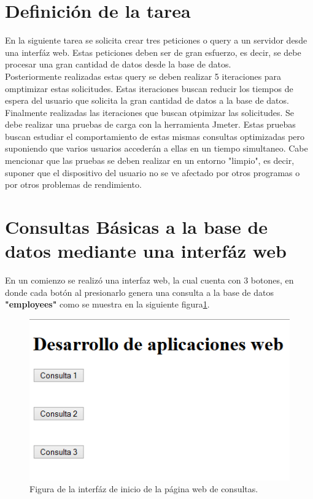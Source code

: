 \section{Definición de la tarea} \label{tarea}

En la siguiente tarea se solicita crear tres peticiones o query a un servidor desde una interfáz web. Estas peticiones deben ser de gran esfuerzo, es decir, se debe procesar una gran cantidad de datos desde la base de datos.\\

Posteriormente realizadas estas query se deben realizar 5 iteraciones para omptimizar estas solicitudes. Estas iteraciones buscan reducir los tiempos de espera del usuario que solicita la gran cantidad de datos a la base de datos.\\

Finalmente realizadas las iteraciones que buscan otpimizar las solicitudes. Se debe realizar una pruebas de carga con la herramienta Jmeter. Estas pruebas buscan estudiar el comportamiento de estas mismas consultas optimizadas pero suponiendo que varios usuarios accederán a ellas en un tiempo simultaneo. Cabe mencionar que las pruebas se deben realizar en un entorno "limpio", es decir, suponer que el dispositivo del usuario no se ve afectado por otros programas o por otros problemas de rendimiento. \\

\section{Consultas Básicas a la base de datos mediante una interfáz web}

En un comienzo se realizó una interfaz web, la cual cuenta con 3 botones, en donde cada botón al presionarlo genera una consulta a la base de datos \textbf{"employees"} como se muestra en la siguiente figura\ref{Figura}. 

\begin{figure}[htb]
	\label{Figura}
	\begin{center}
		\includegraphics[scale=0.5]{imagenes/inicio.png}
	\end{center}
	\caption{Figura de la interfáz de inicio de la página web de consultas.}
\end{figure}
 
 
